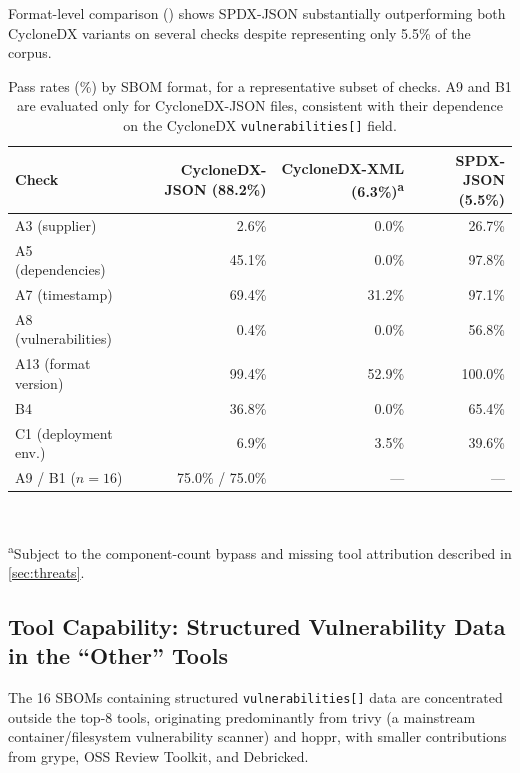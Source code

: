 \documentclass[11pt]{article}
\begin{document}
Format-level comparison () shows SPDX-JSON substantially outperforming both CycloneDX variants on several checks despite representing only 5.5\% of the corpus.

\begin{table}[t]
\centering
\caption{Pass rates (\%) by SBOM format, for a representative subset of checks. A9 and B1 are evaluated only for CycloneDX-JSON files, consistent with their dependence on the CycloneDX \texttt{vulnerabilities[]} field.}
\label{tab:format-breakdown}
\begin{tabular}{lrrr}
\toprule
Check & CycloneDX-JSON (88.2\%) & CycloneDX-XML (6.3\%)\textsuperscript{a} & SPDX-JSON (5.5\%) \\
\midrule
A3 (supplier) & 2.6\% & 0.0\% & 26.7\% \\
A5 (dependencies) & 45.1\% & 0.0\% & 97.8\% \\
A7 (timestamp) & 69.4\% & 31.2\% & 97.1\% \\
A8 (vulnerabilities) & 0.4\% & 0.0\% & 56.8\% \\
A13 (format version) & 99.4\% & 52.9\% & 100.0\% \\
B4 & 36.8\% & 0.0\% & 65.4\% \\
C1 (deployment env.) & 6.9\% & 3.5\% & 39.6\% \\
A9 / B1 ($n=16$) & 75.0\% / 75.0\% & --- & --- \\
\bottomrule
\end{tabular}
\\[2pt]
\raggedright\footnotesize\textsuperscript{a}Subject to the component-count bypass and missing tool attribution described in \cref{sec:threats}.
\end{table}

\subsection{Tool Capability: Structured Vulnerability Data in the ``Other'' Tools}
\label{sec:existence-proof}

The 16 SBOMs containing structured \texttt{vulnerabilities[]} data are concentrated outside the top-8 tools, originating predominantly from trivy (a mainstream container/filesystem vulnerability scanner) and hoppr, with smaller contributions from grype, OSS Review Toolkit, and Debricked.
\end{document}
